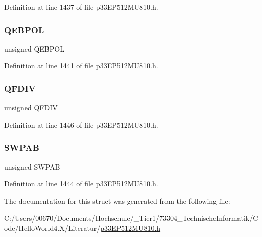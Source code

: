 Definition at line 1437 of file p33\+E\+P512\+M\+U810.\+h.

\mbox{\label{structtag_q_e_i1_i_o_c_b_i_t_s_acc4d6b7648aba40233c55b8e2fbd3b70}} 
\subsubsection{\texorpdfstring{Q\+E\+B\+P\+OL}{QEBPOL}}
{\footnotesize\ttfamily unsigned Q\+E\+B\+P\+OL}



Definition at line 1441 of file p33\+E\+P512\+M\+U810.\+h.

\mbox{\label{structtag_q_e_i1_i_o_c_b_i_t_s_a22d6fb9c6c4624daa74340826a9a06cb}} 
\subsubsection{\texorpdfstring{Q\+F\+D\+IV}{QFDIV}}
{\footnotesize\ttfamily unsigned Q\+F\+D\+IV}



Definition at line 1446 of file p33\+E\+P512\+M\+U810.\+h.

\mbox{\label{structtag_q_e_i1_i_o_c_b_i_t_s_ac733d4f6fbe27b15c7b2968f3b544589}} 
\subsubsection{\texorpdfstring{S\+W\+P\+AB}{SWPAB}}
{\footnotesize\ttfamily unsigned S\+W\+P\+AB}



Definition at line 1444 of file p33\+E\+P512\+M\+U810.\+h.



The documentation for this struct was generated from the following file\+:\begin{DoxyCompactItemize}
\item 
C\+:/\+Users/00670/\+Documents/\+Hochschule/\+\_\+\+Tier1/73304\+\_\+\+Technische\+Informatik/\+Code/\+Hello\+World4.\+X/\+Literatur/\hyperlink{p33_e_p512_m_u810_8h}{p33\+E\+P512\+M\+U810.\+h}\end{DoxyCompactItemize}

